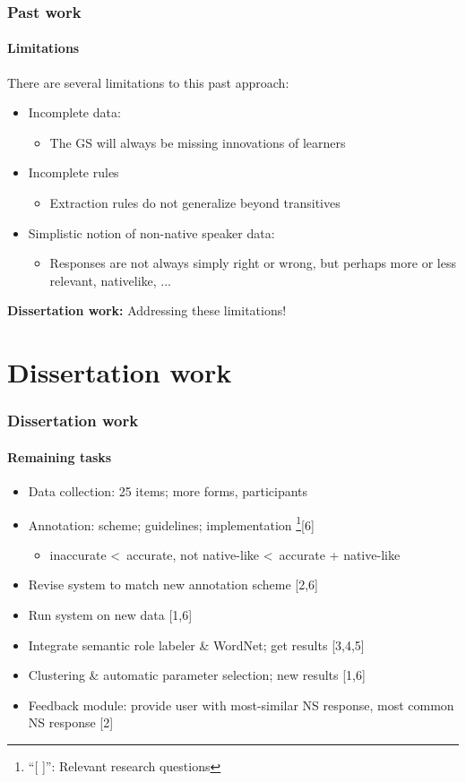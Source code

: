 \documentclass{beamer}
\begin{document}
\begin{frame}
\frametitle{Past work}
\framesubtitle{Limitations}

There are several limitations to this past approach:
\medskip
\begin{itemize}
\item Incomplete data:
  \begin{itemize}
  \item The GS will always be missing innovations of learners
  \end{itemize}
  \smallskip
\item Incomplete rules
  \begin{itemize}
  \item Extraction rules do not generalize beyond transitives
  \end{itemize}
  \smallskip
\item Simplistic notion of non-native speaker data:
  \begin{itemize}
  \item Responses are not always simply right or wrong, but perhaps more
    or less relevant, nativelike, ...
  \end{itemize}
\end{itemize}

\medskip

\textbf{Dissertation work:} Addressing these limitations!

\end{frame}

\section{Dissertation work}

\begin{frame}
\frametitle{Dissertation work}
\framesubtitle{Remaining tasks}
\begin{itemize}
\small
\item Data collection: 25 items; more forms, participants
\item Annotation: scheme; guidelines; implementation \footnote{``[ ]'': Relevant research questions}[6]
\begin{itemize}
\item \footnotesize{inaccurate \textless \ accurate, not native-like \textless \ accurate + native-like}
\end{itemize}
\item Revise system to match new annotation scheme [2,6]
\item Run system on new data [1,6]
\item Integrate semantic role labeler \& WordNet; get results [3,4,5]
\item Clustering \& automatic parameter selection; new results [1,6]
\item Feedback module: provide user with most-similar NS response, most common NS response [2]
\end{itemize}
\end{frame}
\end{document}
